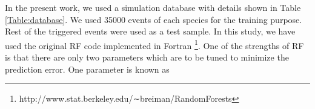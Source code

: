 \documentclass[preprint,12pt]{elsarticle}
\begin{document}
In the present work, we used a simulation database with details shown in Table \ref{Table:database}. 
We used 35000 events of each species for the training purpose. Rest of the triggered events were used as a test sample. 
In this study, we have used the original RF code implemented in Fortran \footnote{\small http://www.stat.berkeley.edu/∼breiman/RandomForests}. 
One of the strengths of RF is that there are only two parameters which are to be tuned to minimize the prediction error. One parameter is known as 
\end{document}

